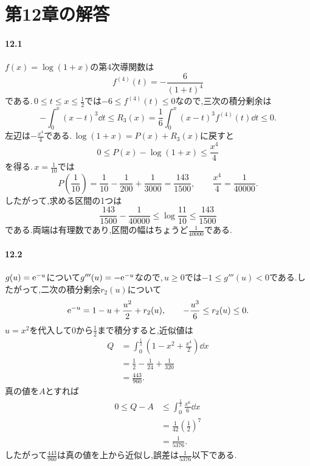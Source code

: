 \section{第12章の解答}\label{解答:第12章}

\paragraph{12.1}
$f(x)=\log(1+x)$の第4次導関数は
\[
 f^{(4)}(t)=-\frac6{(1+t)^4}
\]
である.\,$0\le t\le x\le\frac12$では$-6\le f^{(4)}(t)\le0$なので,三次の積分剰余は
\[
 -\int_0^x(x-t)^3\dd t
 \le R_3(x)=\frac16\int_0^x(x-t)^3f^{(4)}(t)\dd t
 \le0.
\]
左辺は$-\frac{x^4}{4}$である.\,$\log(1+x)=P(x)+R_3(x)$に戻すと
\[
 0\le P(x)-\log(1+x)\le\frac{x^4}{4}
\]
を得る.\,$x=\frac1{10}$では
\[
 P\left(\frac1{10}\right)
 =\frac1{10}-\frac1{200}+\frac1{3000}
 =\frac{143}{1500},\qquad
 \frac{x^4}{4}=\frac1{40000}.
\]
したがって,求める区間の1つは
\[
 \boxed{\frac{143}{1500}-\frac1{40000}
 \le\log\frac{11}{10}\le\frac{143}{1500}}
\]
である.両端は有理数であり,区間の幅はちょうど$\frac1{40000}$である.

\paragraph{12.2}
$g(u)=\mathrm{e}^{-u}$について$g'''(u)=-\mathrm{e}^{-u}$なので,\,$u\ge0$では$-1\le g'''(u)<0$である.したがって,二次の積分剰余$r_2(u)$について
\[
 \mathrm{e}^{-u}=1-u+\frac{u^2}{2}+r_2(u),
 \qquad -\frac{u^3}{6}\le r_2(u)\le0.
\]
$u=x^2$を代入して$0$から$\frac12$まで積分すると,近似値は
\begin{align*}
 Q&=\int_0^{\frac12}\left(1-x^2+\frac{x^4}{2}\right)\dd x\\
 &=\frac12-\frac1{24}+\frac1{320}\\
 &=\frac{443}{960}.
\end{align*}
真の値を$A$とすれば
\begin{align*}
 0\le Q-A
 &\le\int_0^{\frac12}\frac{x^6}{6}\dd x\\
 &=\frac1{42}\left(\frac12\right)^7\\
 &=\frac1{5376}.
\end{align*}
したがって$\frac{443}{960}$は真の値を上から近似し,誤差は$\frac1{5376}$以下である.

